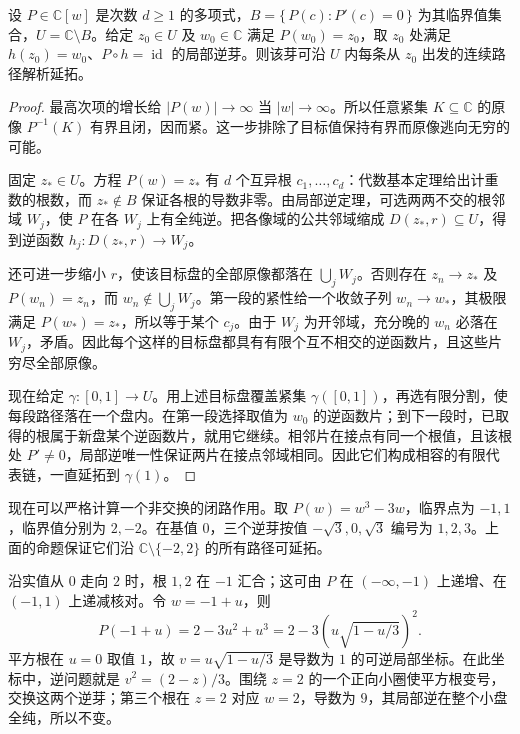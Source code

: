 \begin{proposition}[多项式逆芽的全路径延拓]\label{b3:prop:09-polynomial-inverse-continuation}
设 \(P\in\mathbb C[w]\) 是次数 \(d\ge1\) 的多项式，\(B=\{\,P(c):P'(c)=0\,\}\) 为其临界值集合，\(U=\mathbb C\setminus B\)。给定 \(z_0\in U\) 及 \(w_0\in\mathbb C\) 满足 \(P(w_0)=z_0\)，取 \(z_0\) 处满足 \(h(z_0)=w_0\)、\(P\circ h=\operatorname{id}\) 的局部逆芽。则该芽可沿 \(U\) 内每条从 \(z_0\) 出发的连续路径解析延拓。
\end{proposition}
\begin{proof}
最高次项的增长给 \(|P(w)|\rightarrow\infty\) 当 \(|w|\rightarrow\infty\)。所以任意紧集 \(K\subseteq\mathbb C\) 的原像 \(P^{-1}(K)\) 有界且闭，因而紧。这一步排除了目标值保持有界而原像逃向无穷的可能。

固定 \(z_*\in U\)。方程 \(P(w)=z_*\) 有 \(d\) 个互异根 \(c_1,\ldots,c_d\)：代数基本定理给出计重数的根数，而 \(z_*\notin B\) 保证各根的导数非零。由局部逆定理，可选两两不交的根邻域 \(W_j\)，使 \(P\) 在各 \(W_j\) 上有全纯逆。把各像域的公共邻域缩成 \(D(z_*,r)\subseteq U\)，得到逆函数 \(h_j:D(z_*,r)\rightarrow W_j\)。

还可进一步缩小 \(r\)，使该目标盘的全部原像都落在 \(\bigcup_jW_j\)。否则存在 \(z_n\rightarrow z_*\) 及 \(P(w_n)=z_n\)，而 \(w_n\notin\bigcup_jW_j\)。第一段的紧性给一个收敛子列 \(w_n\rightarrow w_*\)，其极限满足 \(P(w_*)=z_*\)，所以等于某个 \(c_j\)。由于 \(W_j\) 为开邻域，充分晚的 \(w_n\) 必落在 \(W_j\)，矛盾。因此每个这样的目标盘都具有有限个互不相交的逆函数片，且这些片穷尽全部原像。

现在给定 \(\gamma:[0,1]\rightarrow U\)。用上述目标盘覆盖紧集 \(\gamma([0,1])\)，再选有限分割，使每段路径落在一个盘内。在第一段选择取值为 \(w_0\) 的逆函数片；到下一段时，已取得的根属于新盘某个逆函数片，就用它继续。相邻片在接点有同一个根值，且该根处 \(P'\ne0\)，局部逆唯一性保证两片在接点邻域相同。因此它们构成相容的有限代表链，一直延拓到 \(\gamma(1)\)。
\end{proof}

现在可以严格计算一个非交换的闭路作用。取 \(P(w)=w^3-3w\)，临界点为 \(-1,1\)，临界值分别为 \(2,-2\)。在基值 \(0\)，三个逆芽按值 \(-\sqrt3,0,\sqrt3\) 编号为 \(1,2,3\)。上面的命题保证它们沿 \(\mathbb C\setminus\{-2,2\}\) 的所有路径可延拓。

\ProseParagraphBreak
沿实值从 \(0\) 走向 \(2\) 时，根 \(1,2\) 在 \(-1\) 汇合；这可由 \(P\) 在 \(( -\infty,-1)\) 上递增、在 \((-1,1)\) 上递减核对。令 \(w=-1+u\)，则
\[
 P(-1+u)=2-3u^2+u^3
 =2-3\left(u\sqrt{1-u/3}\right)^2.
\]
平方根在 \(u=0\) 取值 \(1\)，故 \(v=u\sqrt{1-u/3}\) 是导数为 \(1\) 的可逆局部坐标。在此坐标中，逆问题就是 \(v^2=(2-z)/3\)。围绕 \(z=2\) 的一个正向小圈使平方根变号，交换这两个逆芽；第三个根在 \(z=2\) 对应 \(w=2\)，导数为 \(9\)，其局部逆在整个小盘全纯，所以不变。

